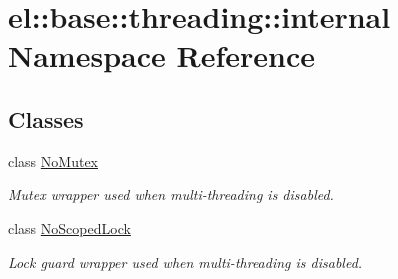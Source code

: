 \hypertarget{namespaceel_1_1base_1_1threading_1_1internal}{}\section{el\+:\+:base\+:\+:threading\+:\+:internal Namespace Reference}
\label{namespaceel_1_1base_1_1threading_1_1internal}
\subsection*{Classes}
\begin{DoxyCompactItemize}
\item 
class \hyperlink{classel_1_1base_1_1threading_1_1internal_1_1_no_mutex}{No\+Mutex}
\begin{DoxyCompactList}\small\item\em Mutex wrapper used when multi-\/threading is disabled. \end{DoxyCompactList}\item 
class \hyperlink{classel_1_1base_1_1threading_1_1internal_1_1_no_scoped_lock}{No\+Scoped\+Lock}
\begin{DoxyCompactList}\small\item\em Lock guard wrapper used when multi-\/threading is disabled. \end{DoxyCompactList}\end{DoxyCompactItemize}
